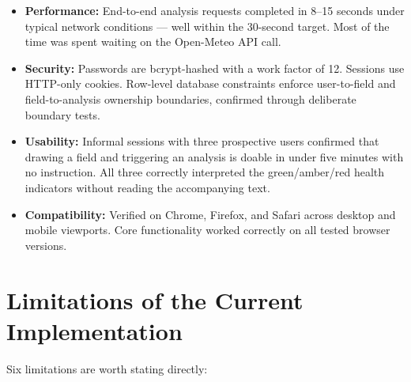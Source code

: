 \begin{itemize}
  \item \textbf{Performance:} End-to-end analysis requests completed in 8--15 seconds under typical network conditions — well within the 30-second target. Most of the time was spent waiting on the Open-Meteo API call.

  \item \textbf{Security:} Passwords are bcrypt-hashed with a work factor of 12. Sessions use HTTP-only cookies. Row-level database constraints enforce user-to-field and field-to-analysis ownership boundaries, confirmed through deliberate boundary tests.

  \item \textbf{Usability:} Informal sessions with three prospective users confirmed that drawing a field and triggering an analysis is doable in under five minutes with no instruction. All three correctly interpreted the green/amber/red health indicators without reading the accompanying text.

  \item \textbf{Compatibility:} Verified on Chrome, Firefox, and Safari across desktop and mobile viewports. Core functionality worked correctly on all tested browser versions.
\end{itemize}

\section{Limitations of the Current Implementation}
\label{sec:limitations}

Six limitations are worth stating directly:

